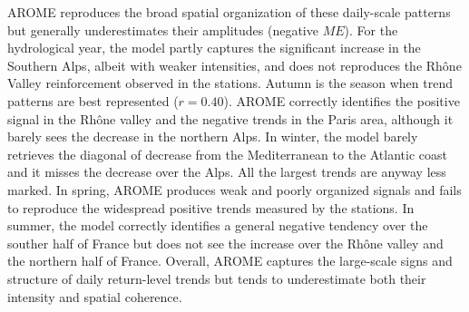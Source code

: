 \documentclass[french,a4paper,DIV=11,numbers=noendperiod]{scrartcl}
\begin{document}
AROME reproduces the broad spatial organization of these daily-scale patterns but generally underestimates their amplitudes (negative $ME$). For the hydrological year, the model partly captures the significant increase in the Southern Alps, albeit with weaker intensities, and does not reproduces the Rhône Valley reinforcement observed in the stations. Autumn is the season when trend patterns are best represented ($r=0.40$). AROME correctly identifies the positive signal in the Rhône valley and the negative trends in the Paris area, although it barely sees the decrease in the northern Alps. In winter, the model barely retrieves the diagonal of decrease from the Mediterranean to the Atlantic coast and it misses the decrease over the Alps. All the largest trends are anyway less marked. In spring, AROME produces weak and poorly organized signals and fails to reproduce the widespread positive trends measured by the stations. In summer, the model correctly identifies a general negative tendency over the souther half of France but does not see the increase over the Rhône valley and the northern half of France. Overall, AROME captures the large-scale signs and structure of daily return-level trends but tends to underestimate both their intensity and spatial coherence.
\end{document}
